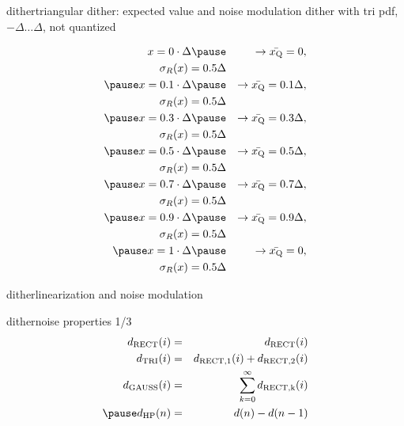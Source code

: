 	\begin{frame}{dither}{triangular dither: expected value and noise modulation}
        \vspace{-3mm}
        dither with tri pdf, $-{\Delta}\ldots {\Delta}$, not quantized
        \begin{footnotesize}
        \begin{eqnarray*}
               x = 0 \cdot \Delta \pause &&\rightarrow \bar{x_\mathrm{Q}} =0,\\ 
            \sigma_R(x) = 0.5\Delta&&\\ 
            \pause
            \smallskip
               x = 0.1 \cdot \Delta \pause &&\rightarrow \bar{x_\mathrm{Q}} = 0.1\Delta ,\\ 
            \sigma_R(x) = 0.5\Delta&&\\ 
            \pause
            \smallskip
               x = 0.3 \cdot \Delta \pause &&\rightarrow \bar{x_\mathrm{Q}} = 0.3\Delta ,\\ 
            \sigma_R(x) = 0.5\Delta&&\\ 
            \pause
            \smallskip
               x = 0.5 \cdot \Delta \pause &&\rightarrow \bar{x_\mathrm{Q}} = 0.5\Delta ,\\ 
            \sigma_R(x) = 0.5\Delta&&\\ 
            \pause
            \smallskip
               x = 0.7 \cdot \Delta \pause &&\rightarrow \bar{x_\mathrm{Q}} = 0.7\Delta ,\\ 
            \sigma_R(x) = 0.5\Delta&&\\ 
            \pause
            \smallskip
               x = 0.9 \cdot \Delta \pause &&\rightarrow \bar{x_\mathrm{Q}} = 0.9\Delta ,\\ 
            \sigma_R(x) = 0.5\Delta&&\\ 
            \pause
            \smallskip
               x = 1 \cdot \Delta \pause &&\rightarrow \bar{x_\mathrm{Q}} =0,\\
            \sigma_R(x) = 0.5\Delta&&
        \end{eqnarray*}
        \end{footnotesize}
	\end{frame}	
	\begin{frame}{dither}{linearization and noise modulation}
        \vspace{-3mm}
	\end{frame}	
	\begin{frame}{dither}{noise properties 1/3}
        \vspace{-3mm}
		\pause
        \vspace{-3mm}
		\begin{eqnarray*}\label{eq:ditherformen}
			d_\mathrm{RECT}(i) &=& d_\mathrm{RECT}(i)\\
			d_\mathrm{TRI}(i) &=& d_\mathrm{RECT,1}(i)+d_\mathrm{RECT,2}(i)\\
			d_\mathrm{GAUSS}(i) &=& \sum\limits_{k=0}^{\infty}d_\mathrm{RECT,k}(i)\\
			\pause
            d_\mathrm{HP}(n) &=& d(n)-d(n-1)
		\end{eqnarray*}
	\end{frame}	
